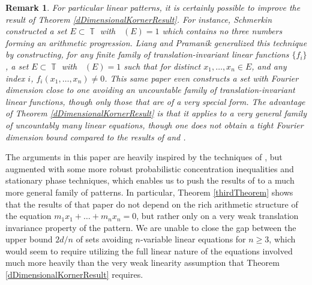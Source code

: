 \documentclass[dvipsnames,letterpaper,12pt]{article}
\numberwithin{equation}{section}
\DeclareMathOperator{\fordim}{\dim_{\mathbb{F}}}
\DeclareMathOperator{\TT}{\mathbb{T}}
\newtheorem{remark}[theorem]{Remark}
\numberwithin{theorem}{section}
\begin{document}
\begin{remark}
    For \emph{particular} linear patterns, it is certainly possible to improve the result of Theorem \ref{dDimensionalKornerResult}. For instance, Schmerkin \cite{Schmerkin} constructed a set $E \subset \TT$ with $\fordim(E) = 1$ which contains no three numbers forming an arithmetic progression. Liang and Pramanik \cite{LiangPramanik} generalized this technique by constructing, for any finite family of translation-invariant linear functions $\{ f_i \}$, a set $E \subset \TT$ with $\fordim(E) = 1$ such that for distinct $x_1,\dots,x_n \in E$, and any index $i$, $f_i(x_1,\dots,x_n) \neq 0$. This same paper even constructs a set with Fourier dimension close to one avoiding an uncountable family of translation-invariant linear functions, though only those that are of a very special form. The advantage of Theorem \ref{dDimensionalKornerResult} is that it applies to a very general family of uncountably many linear equations, though one does not obtain a tight Fourier dimension bound compared to the results of \cite{LiangPramanik} and \cite{Schmerkin}.
\end{remark}

The arguments in this paper are heavily inspired by the techniques of \cite{Korner2}, but augmented with some more robust probabilistic concentration inequalities and stationary phase techniques, which enables us to push the results of \cite{Korner2} to a much more general family of patterns. In particular, Theorem \ref{thirdTheorem} shows that the results of that paper do not depend on the rich arithmetic structure of the equation $m_1x_1 + \dots + m_nx_n = 0$, but rather only on a very weak translation invariance property of the pattern. We are unable to close the gap between the upper bound $2d/n$ of sets avoiding $n$-variable linear equations for $n \geq 3$, which would seem to require utilizing the full linear nature of the equations involved much more heavily than the very weak linearity assumption that Theorem \ref{dDimensionalKornerResult} requires.

\end{document}
